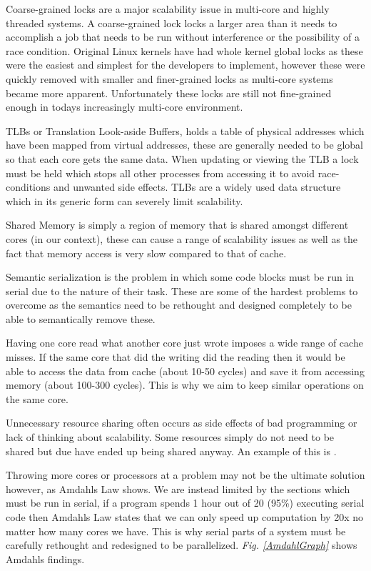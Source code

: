 \documentclass[journal]{IEEEtran}
\begin{document}
\vspace{5mm}

Coarse-grained locks are a major scalability issue in multi-core and highly threaded systems. A coarse-grained lock locks a larger area than it needs to accomplish a job that needs to be run without interference or the possibility of a race condition. Original Linux kernels have had whole kernel global locks as these were the easiest and simplest for the developers to implement, however these were quickly removed with smaller and finer-grained locks as multi-core systems became more apparent. Unfortunately these locks are still not fine-grained enough in todays increasingly multi-core environment. \cite{Berlin} 

TLBs or Translation Look-aside Buffers, holds a table of physical addresses which have been mapped from virtual addresses, these are generally needed to be global so that each core gets the same data. When updating or viewing the TLB a lock must be held which stops all other processes from accessing it to avoid race-conditions and unwanted side effects. TLBs are a widely used data structure which in its generic form can severely limit scalability.

Shared Memory is simply a region of memory that is shared amongst different cores (in our context), these can cause a range of scalability issues as well as the fact that memory access is very slow compared to that of cache.

Semantic serialization is the problem in which some code blocks must be run in serial due to the nature of their task. These are some of the hardest problems to overcome as the semantics need to be rethought and designed completely to be able to semantically remove these.

Having one core read what another core just wrote imposes a wide range of cache misses. If the same core that did the writing did the reading then it would be able to access the data from cache (about 10-50 cycles) and save it from accessing memory (about 100-300 cycles). This is why we aim to keep similar operations on the same core.

Unnecessary resource sharing often occurs as side effects of bad programming or lack of thinking about scalability. Some resources simply do not need to be shared but due have ended up being shared anyway. An example of this is .

Throwing more cores or processors at a problem may not be the ultimate solution however, as Amdahls Law \cite{Amdahl} shows. We are instead limited by the sections which must be run in serial, if a program spends 1 hour out of 20 (95\%) executing serial code then Amdahls Law states that we can only speed up computation by 20x no matter how many cores we have. This is why serial parts of a system must be carefully rethought and redesigned to be parallelized. \emph{Fig. \ref{AmdahlGraph}} shows Amdahls findings. 
\end{document}
